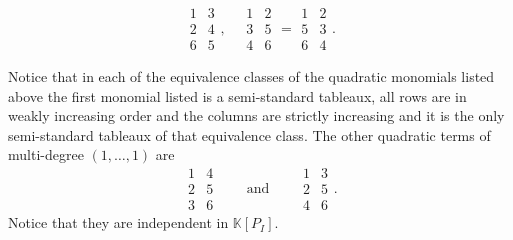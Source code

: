 \documentclass[ALCO,ThmDefs,Unicode,epreuves]{cedram}
\begin{document}
\begin{exam}
\[\begin{array}{c}1 \\2 \\6\end{array} 
\begin{array}{c}3 \\4 \\5\end{array},\quad 
\begin{array}{c}1 \\3 \\4\end{array} 
\begin{array}{c}2 \\5 \\6\end{array} = 
\begin{array}{c}1 \\5 \\6\end{array} 
\begin{array}{c}2 \\3 \\4\end{array}.
\]

Notice that in each of the equivalence classes of the quadratic monomials listed above the first monomial listed is a semi-standard tableaux, \ie all rows are in weakly increasing order and the columns are strictly increasing and it is the only semi-standard tableaux of that equivalence class. 
The other quadratic terms of multi-degree $(1, \ldots, 1)$ are
\[
 \begin{array}{c}1 \\2 \\3\end{array} 
\begin{array}{c}4 \\5 \\6\end{array} 
\qquad \text{and} \qquad
\begin{array}{c}1 \\2 \\4\end{array}
\begin{array}{c}3 \\5 \\6\end{array}.
\]
Notice that they are independent in $\mathbb{K}[P_I]$. 
\end{exam}
\end{document}
